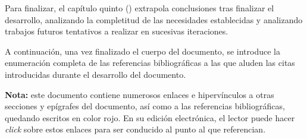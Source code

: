 Para finalizar, el capítulo quinto () extrapola conclusiones tras finalizar el desarrollo, analizando la completitud de las necesidades establecidas y analizando trabajos futuros tentativos a realizar en sucesivas iteraciones.

A continuación, una vez finalizado el cuerpo del documento, se introduce la enumeración completa de las referencias bibliográficas a las que aluden las citas introducidas durante el desarrollo del documento.

\noindent\textbf{Nota:} este documento contiene numerosos enlaces e hipervínculos a otras secciones y epígrafes del documento, así como a las referencias bibliográficas, quedando escritos en {\color{RedLink}color rojo}. En su edición electrónica, el lector puede hacer \textit{click} sobre estos enlaces para ser conducido al punto al que referencian.
